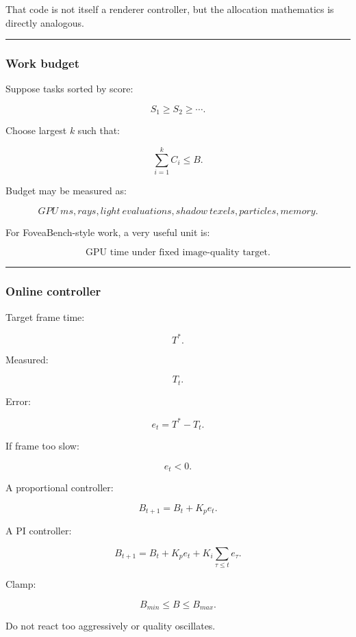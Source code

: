 That code is not itself a renderer controller, but the allocation mathematics is directly analogous.

\begin{center}\rule{0.5\linewidth}{0.5pt}\end{center}

\subsubsection{Work budget}\label{work-budget}

Suppose tasks sorted by score:

\[
S_1\ge S_2\ge\cdots.
\]

Choose largest \(k\) such that:

\[
\boxed{
\sum_{i=1}^{k}C_i
\le B.
}
\]

Budget may be measured as:

\[
GPU\ ms,
rays,
light\ evaluations,
shadow\ texels,
particles,
memory.
\]

For FoveaBench-style work, a very useful unit is:

\[
\boxed{
\text{GPU time under fixed image-quality target}.
}
\]

\begin{center}\rule{0.5\linewidth}{0.5pt}\end{center}

\subsubsection{Online controller}\label{online-controller}

Target frame time:

\[
T^*.
\]

Measured:

\[
T_t.
\]

Error:

\[
e_t=
T^*-T_t.
\]

If frame too slow:

\[
e_t<0.
\]

A proportional controller:

\[
B_{t+1}
=
B_t
+
K_p e_t.
\]

A PI controller:

\[
\boxed{
B_{t+1}
=
B_t
+
K_p e_t
+
K_i\sum_{\tau\le t}e_\tau.
}
\]

Clamp:

\[
B_{min}\le B\le B_{max}.
\]

Do not react too aggressively or quality oscillates.

